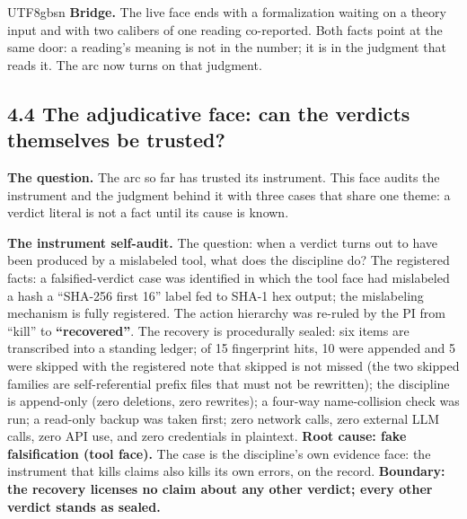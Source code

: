 \documentclass[11pt,letterpaper]{article}
\begin{document}
\begin{CJK}{UTF8}{gbsn}
\textbf{Bridge.} The live face ends with a formalization waiting on a theory input \textemdash{} and with two calibers of one reading co-reported. Both facts point at the same door: a reading's meaning is not in the number; it is in the judgment that reads it. The arc now turns on that judgment.

\subsection*{4.4 The adjudicative face: can the verdicts themselves be trusted?}

\textbf{The question.} The arc so far has trusted its instrument. This face audits the instrument and the judgment behind it \textemdash{} with three cases that share one theme: a verdict literal is not a fact until its cause is known.

\textbf{The instrument self-audit.} The question: when a verdict turns out to have been produced by a mislabeled tool, what does the discipline do? The registered facts: a falsified-verdict case was identified in which the tool face had mislabeled a hash \textemdash{} a ``SHA-256 first 16'' label fed to SHA-1 hex output; the mislabeling mechanism is fully registered. The action hierarchy was re-ruled by the PI from ``kill'' to \textbf{``recovered''}. The recovery is procedurally sealed: six items are transcribed into a standing ledger; of 15 fingerprint hits, 10 were appended and 5 were skipped \textemdash{} with the registered note that skipped is not missed (the two skipped families are self-referential prefix files that must not be rewritten); the discipline is append-only (zero deletions, zero rewrites); a four-way name-collision check was run; a read-only backup was taken first; zero network calls, zero external LLM calls, zero API use, and zero credentials in plaintext. \textbf{Root cause: fake falsification (tool face).} The case is the discipline's own evidence face: the instrument that kills claims also kills its own errors, on the record. \textbf{Boundary: the recovery licenses no claim about any other verdict; every other verdict stands as sealed.}


\end{CJK}
\end{document}
